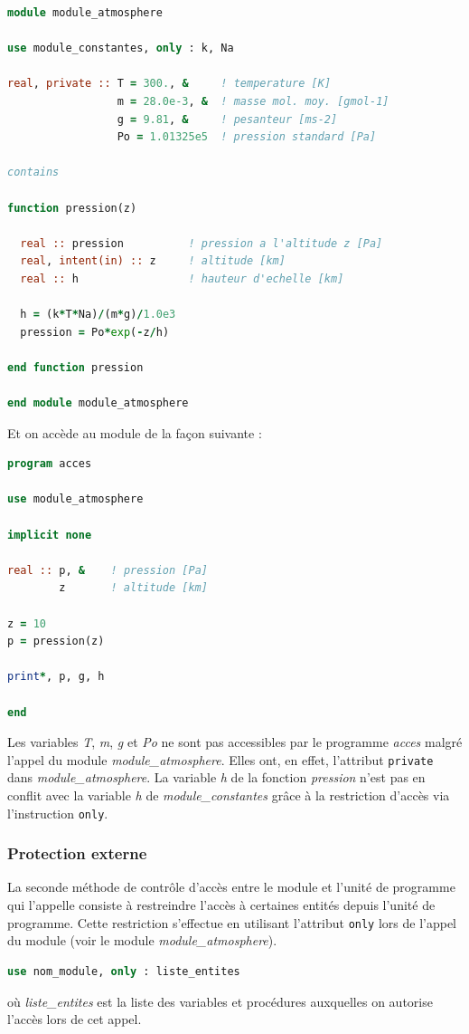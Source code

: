 \documentclass[a4paper,twoside]{article}
\begin{document}
\begin{lstlisting}[language=Fortran]
module module_atmosphere

use module_constantes, only : k, Na

real, private :: T = 300., &     ! temperature [K]
                 m = 28.0e-3, &  ! masse mol. moy. [gmol-1]
                 g = 9.81, &     ! pesanteur [ms-2]
                 Po = 1.01325e5  ! pression standard [Pa]

contains

function pression(z)

  real :: pression          ! pression a l'altitude z [Pa]
  real, intent(in) :: z     ! altitude [km]
  real :: h                 ! hauteur d'echelle [km]

  h = (k*T*Na)/(m*g)/1.0e3
  pression = Po*exp(-z/h)

end function pression

end module module_atmosphere
\end{lstlisting}

Et on accède au module de la façon suivante : 
\begin{lstlisting}[language=Fortran]
program acces

use module_atmosphere

implicit none

real :: p, &    ! pression [Pa]
        z       ! altitude [km]

z = 10
p = pression(z)

print*, p, g, h

end
\end{lstlisting}

Les variables \emph{T}, \emph{m}, \emph{g} et \emph{Po} ne sont pas accessibles par le programme \emph{acces} malgré l'appel du module \emph{module\_atmosphere}. Elles ont, en effet, l'attribut \texttt{private} dans \emph{module\_atmosphere}. La variable \emph{h} de la fonction \emph{pression} n'est pas en conflit avec la variable \emph{h} de \emph{module\_constantes} grâce à la restriction d'accès via l'instruction \texttt{only}.

\subsubsection{Protection externe}
La seconde méthode de contrôle d'accès entre le module et l'unité de programme qui l'appelle consiste à restreindre l'accès à certaines entités depuis l'unité de programme. Cette restriction s'effectue en utilisant l'attribut \texttt{only} lors de l'appel du module (voir le module \emph{module\_atmosphere}).
\begin{lstlisting}[language=Fortran]
use nom_module, only : liste_entites
\end{lstlisting}
où \emph{liste\_entites} est la liste des variables et procédures auxquelles on autorise l'accès lors de cet appel.
\end{document}
